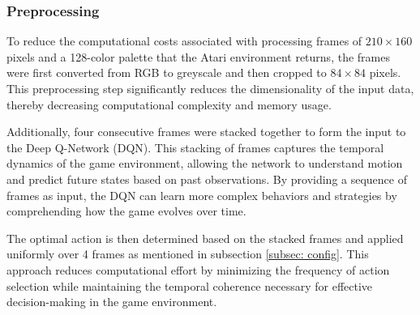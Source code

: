 \subsubsection{Preprocessing}
To reduce the computational costs associated with processing frames of \(210 \times 160\) pixels and a 128-color palette that the Atari environment returns, the frames were first converted from RGB to greyscale and then cropped to \(84 \times 84\) pixels. This preprocessing step significantly reduces the dimensionality of the input data, thereby decreasing computational complexity and memory usage. 

Additionally, four consecutive frames were stacked together to form the input to the Deep Q-Network (DQN). This stacking of frames captures the temporal dynamics of the game environment, allowing the network to understand motion and predict future states based on past observations. By providing a sequence of frames as input, the DQN can learn more complex behaviors and strategies by comprehending how the game evolves over time.

The optimal action is then determined based on the stacked frames and applied uniformly over 4 frames as mentioned in subsection \ref{subsec: config}. This approach reduces computational effort by minimizing the frequency of action selection while maintaining the temporal coherence necessary for effective decision-making in the game environment.
